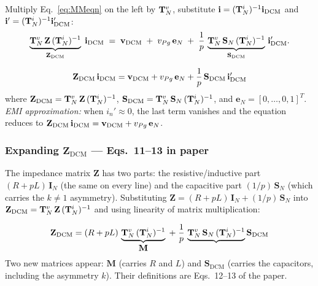 Multiply Eq.~\eqref{eq:MMeqn} on the left by $\mathbf{T}^{v}_{N}$, substitute
$\mathbf{i} = (\mathbf{T}^{i}_{N})^{-1}\mathbf{i}_{\mathrm{DCM}}$ and
$\mathbf{i}' = (\mathbf{T}^{i}_{N})^{-1}\mathbf{i}'_{\mathrm{DCM}}$:
\[
    \underbrace{\mathbf{T}^{v}_{N}\,\mathbf{Z}\,(\mathbf{T}^{i}_{N})^{-1}}_{\mathbf{Z}_{\mathrm{DCM}}}
    \;\mathbf{i}_{\mathrm{DCM}}
    \;=\;
    \mathbf{v}_{\mathrm{DCM}}
    \;+\; v_{Pg}\,\mathbf{e}_N
    \;+\; \frac{1}{p}\,\underbrace{\mathbf{T}^{v}_{N}\,\mathbf{S}_N\,(\mathbf{T}^{i}_{N})^{-1}}
                                   _{\mathbf{S}_{\mathrm{DCM}}}
    \,\mathbf{i}'_{\mathrm{DCM}}.
\]

\begin{eqnbox}
\begin{equation}
    \mathbf{Z}_{\mathrm{DCM}}\,\mathbf{i}_{\mathrm{DCM}}
    = \mathbf{v}_{\mathrm{DCM}} + v_{Pg}\,\mathbf{e}_N
    + \frac{1}{p}\,\mathbf{S}_{\mathrm{DCM}}\,\mathbf{i}'_{\mathrm{DCM}}
    \label{eq:DCMeqn}
\end{equation}
where $\mathbf{Z}_{\mathrm{DCM}} = \mathbf{T}^{v}_{N}\,\mathbf{Z}\,(\mathbf{T}^{i}_{N})^{-1}$,\;
$\mathbf{S}_{\mathrm{DCM}} = \mathbf{T}^{v}_{N}\,\mathbf{S}_N\,(\mathbf{T}^{i}_{N})^{-1}$,\;
and $\mathbf{e}_N = [0,\ldots,0,1]^T$.\\[4pt]
\textit{EMI approximation:} when $i_n' \approx 0$, the last term
vanishes and the equation reduces to
$\mathbf{Z}_{\mathrm{DCM}}\,\mathbf{i}_{\mathrm{DCM}} = \mathbf{v}_{\mathrm{DCM}} + v_{Pg}\,\mathbf{e}_N$.
\end{eqnbox}

\subsubsection*{Expanding $\mathbf{Z}_{\mathrm{DCM}}$ — Eqs.~11--13 in paper}

The impedance matrix $\mathbf{Z}$ has two parts: the resistive/inductive
part $(R + pL)\,\mathbf{I}_N$ (the same on every line) and the capacitive
part $(1/p)\,\mathbf{S}_N$ (which carries the $k \neq 1$ asymmetry).
Substituting $\mathbf{Z} = (R + pL)\,\mathbf{I}_N + (1/p)\,\mathbf{S}_N$
into $\mathbf{Z}_{\mathrm{DCM}} = \mathbf{T}^{v}_{N}\,\mathbf{Z}\,(\mathbf{T}^{i}_{N})^{-1}$ and
using linearity of matrix multiplication:

\begin{eqnbox}
\begin{equation}
    \mathbf{Z}_{\mathrm{DCM}}
    = (R + pL)\,\underbrace{\mathbf{T}^{v}_{N}\,(\mathbf{T}^{i}_{N})^{-1}}_{\displaystyle\mathbf{M}}
    \;+\; \frac{1}{p}\,\underbrace{\mathbf{T}^{v}_{N}\,\mathbf{S}_N\,(\mathbf{T}^{i}_{N})^{-1}}
                                   {\displaystyle\mathbf{S}_{\mathrm{DCM}}}
    \label{eq:Zdcm_expanded}
\end{equation}
Two new matrices appear: $\mathbf{M}$ (carries $R$ and $L$) and
$\mathbf{S}_{\mathrm{DCM}}$ (carries the capacitors, including the asymmetry
$k$).  Their definitions are Eqs.~12--13 of the paper.
\end{eqnbox}

